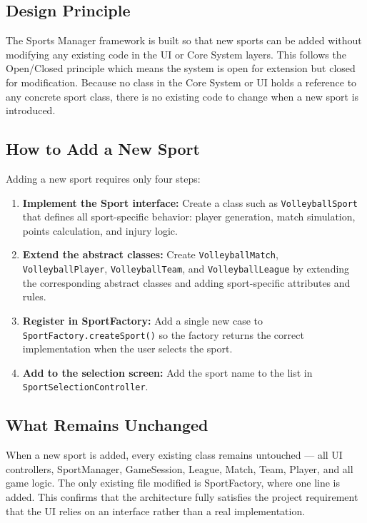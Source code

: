 \documentclass[12pt, a4paper]{article}
\begin{document}
\subsection{Design Principle}

The Sports Manager framework is built so that new sports can be added without modifying any
existing code in the UI or Core System layers. This follows the Open/Closed principle which
means the system is open for extension but closed for modification. Because no class in the
Core System or UI holds a reference to any concrete sport class, there is no existing code to
change when a new sport is introduced.

\subsection{How to Add a New Sport}

Adding a new sport requires only four steps:

\begin{enumerate}
    \item \textbf{Implement the Sport interface:} Create a class such as \texttt{VolleyballSport} that defines all sport-specific behavior: player generation, match simulation, points calculation, and injury logic.

    \item \textbf{Extend the abstract classes:} Create \texttt{VolleyballMatch}, \texttt{VolleyballPlayer}, \texttt{VolleyballTeam}, and \texttt{VolleyballLeague} by extending the corresponding abstract classes and adding sport-specific attributes and rules.

    \item \textbf{Register in SportFactory:} Add a single new case to \texttt{SportFactory.createSport()} so the factory returns the correct implementation when the user selects the sport.

    \item \textbf{Add to the selection screen:} Add the sport name to the list in \texttt{SportSelectionController}.
\end{enumerate}

\subsection{What Remains Unchanged}

When a new sport is added, every existing class remains untouched — all UI controllers,
SportManager, GameSession, League, Match, Team, Player, and all game logic. The only
existing file modified is SportFactory, where one line is added. This confirms that the
architecture fully satisfies the project requirement that the UI relies on an interface rather than
a real implementation.
\end{document}

